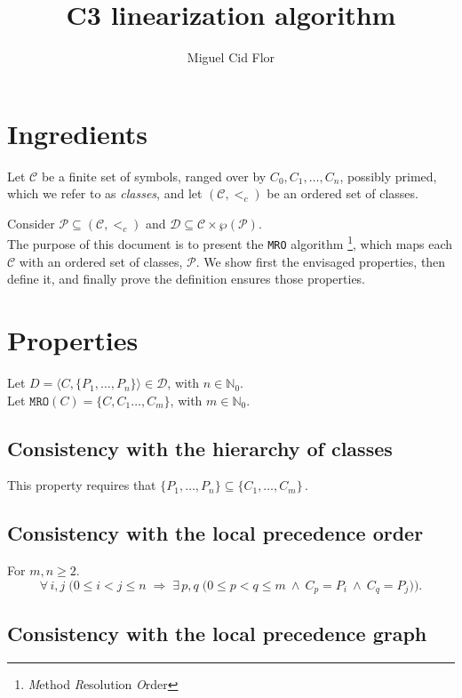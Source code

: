 \documentclass{article}
\title{C3 linearization algorithm}
\author{Miguel Cid Flor}
\newcommand*{\CC}{\ensuremath{\mathcal{C}}\xspace}
\newcommand*{\DD}{\ensuremath{\mathcal{D}}\xspace}
\newcommand*{\ordCC}{\ensuremath{(\mathcal{C}, <_c)}\xspace}
\newcommand*{\mro}{\texttt{MRO}}
\newcommand*{\natz}{\ensuremath{\mathbb{N}_0}}
\begin{document}
\maketitle

\section*{Ingredients}

Let \CC be a finite set of symbols, ranged over by \( C_0, C_1, \ldots, C_n \), possibly primed, which we refer to as \emph{classes}, and let \ordCC be an ordered set of classes. %

Consider $\mathcal P \subseteq \ordCC$ and $\DD \subseteq \CC \times \wp{(\mathcal P)}$.\\

The purpose of this document is to present the \texttt{MRO} algorithm%
\footnote{\emph{M}ethod \emph{R}esolution \emph{O}rder},
which maps each $\CC$ with an ordered set of classes, $\mathcal P$. We show first the envisaged properties, then define it, and finally prove the definition ensures those properties.


\section*{Properties}

Let $D = \langle C, \{P_1, \dots, P_n\} \rangle \in \DD$, with $n\in\natz$.\\
Let $\mro(C) = \{C,C_1 \dots, C_m\}$, with $m \in \natz$.\\
\subsection*{Consistency with the hierarchy of classes} 
This property requires that
\(
\{P_1, \dots, P_n\} \subseteq \{C_1, \dots, C_m\}\,.
\)


\subsection*{Consistency with the local precedence order}
For $m,n \geq 2$.\\
\[
\forall\,i,j\;\bigl(0\le i<j\le n
\;\Longrightarrow\;
\exists\,p,q\;\bigl(0\le p<q\le m \ \wedge \ C_p=P_i \ \wedge \ C_q=P_j\bigr)\bigr).
\]

\subsection*{Consistency with the local precedence graph}
\end{document}
